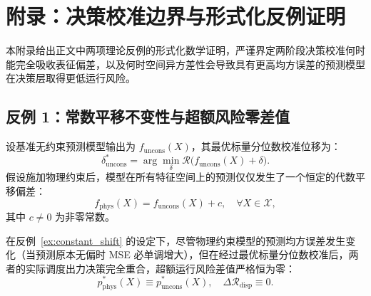 \section{附录：决策校准边界与形式化反例证明}
\label{sec:appendix_proofs}

本附录给出正文中两项理论反例的形式化数学证明，严谨界定两阶段决策校准何时能完全吸收表征偏差，以及何时空间异方差性会导致具有更高均方误差的预测模型在决策层取得更低运行风险。

\subsection{反例 1：常数平移不变性与超额风险零差值}
\label{sec:proof_ex1}

\begin{example}[常数平移不变性]
\label{ex:constant_shift}
设基准无约束预测模型输出为 $f_{\text{uncons}}(X)$，其最优标量分位数校准位移为：
\begin{equation}
\delta_{\text{uncons}}^* = \arg\min_\delta \mathcal{R}\big( f_{\text{uncons}}(X) + \delta \big).
\end{equation}
假设施加物理约束后，模型在所有特征空间上的预测仅仅发生了一个恒定的代数平移偏差：
\begin{equation}
f_{\text{phys}}(X) = f_{\text{uncons}}(X) + c, \quad \forall X \in \mathcal{X},
\end{equation}
其中 $c \neq 0$ 为非零常数。
\end{example}

\begin{proposition}
在反例~\ref{ex:constant_shift} 的设定下，尽管物理约束模型的预测均方误差发生变化（当预测原本无偏时 MSE 必单调增大），但在经过最优标量分位数校准后，两者的实际调度出力决策完全重合，超额运行风险差值严格恒为零：
\begin{equation}
p_{\text{phys}}^*(X) \equiv p_{\text{uncons}}^*(X), \quad \Delta \mathcal{R}_{\text{disp}} \equiv 0.
\end{equation}
\end{proposition}

